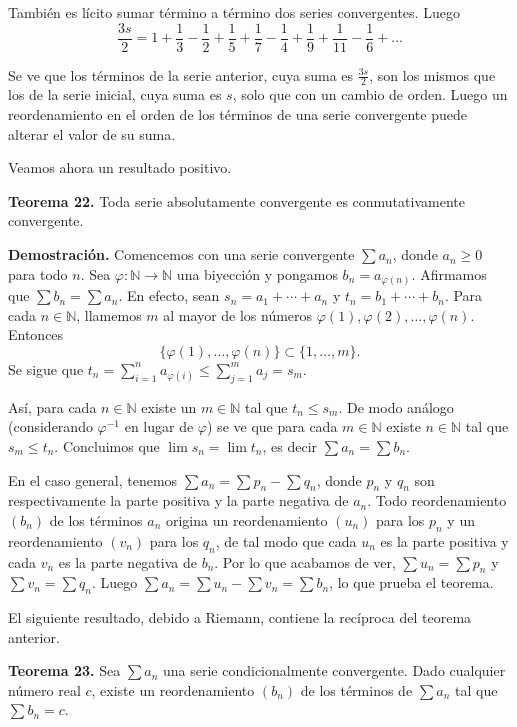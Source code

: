 \documentclass[12pt,oneside]{book}
\begin{document}
También es lícito sumar término a término dos series convergentes. Luego
\[
\frac{3s}{2} = 1 + \frac{1}{3} - \frac{1}{2} + \frac{1}{5} + \frac{1}{7} - \frac{1}{4} + \frac{1}{9} + \frac{1}{11} - \frac{1}{6} + \dots
\]

Se ve que los términos de la serie anterior, cuya suma es \(\frac{3s}{2}\), son los mismos que los de la serie inicial, cuya suma es \(s\), solo que con un cambio de orden. Luego un reordenamiento en el orden de los términos de una serie convergente puede alterar el valor de su suma.

Veamos ahora un resultado positivo.

\textbf{Teorema 22.} Toda serie absolutamente convergente es conmutativamente convergente.

\textbf{Demostración.} Comencemos con una serie convergente \(\sum a_n\), donde \(a_n \ge 0\) para todo \(n\). Sea \(\varphi: \mathbb{N} \to \mathbb{N}\) una biyección y pongamos \(b_n = a_{\varphi(n)}\). Afirmamos que \(\sum b_n = \sum a_n\). En efecto, sean \(s_n = a_1 + \cdots + a_n\) y \(t_n = b_1 + \cdots + b_n\). Para cada \(n \in \mathbb{N}\), llamemos \(m\) al mayor de los números \(\varphi(1), \varphi(2), \ldots, \varphi(n)\). Entonces
\[
\{\varphi(1), \ldots, \varphi(n)\} \subset \{1, \ldots, m\}.
\]
Se sigue que \(t_n = \sum_{i=1}^n a_{\varphi(i)} \le \sum_{j=1}^m a_j = s_m\).

Así, para cada \(n \in \mathbb{N}\) existe un \(m \in \mathbb{N}\) tal que \(t_n \le s_m\). De modo análogo (considerando \(\varphi^{-1}\) en lugar de \(\varphi\)) se ve que para cada \(m \in \mathbb{N}\) existe \(n \in \mathbb{N}\) tal que \(s_m \le t_n\). Concluimos que \(\lim s_n = \lim t_n\), es decir \(\sum a_n = \sum b_n\).

En el caso general, tenemos \(\sum a_n = \sum p_n - \sum q_n\), donde \(p_n\) y \(q_n\) son respectivamente la parte positiva y la parte negativa de \(a_n\). Todo reordenamiento \((b_n)\) de los términos \(a_n\) origina un reordenamiento \((u_n)\) para los \(p_n\) y un reordenamiento \((v_n)\) para los \(q_n\), de tal modo que cada \(u_n\) es la parte positiva y cada \(v_n\) es la parte negativa de \(b_n\). Por lo que acabamos de ver, \(\sum u_n = \sum p_n\) y \(\sum v_n = \sum q_n\). Luego \(\sum a_n = \sum u_n - \sum v_n = \sum b_n\), lo que prueba el teorema.

El siguiente resultado, debido a Riemann, contiene la recíproca del teorema anterior.

\textbf{Teorema 23.} Sea \(\sum a_n\) una serie condicionalmente convergente. Dado cualquier número real \(c\), existe un reordenamiento \((b_n)\) de los términos de \(\sum a_n\) tal que \(\sum b_n = c\).
\end{document}
